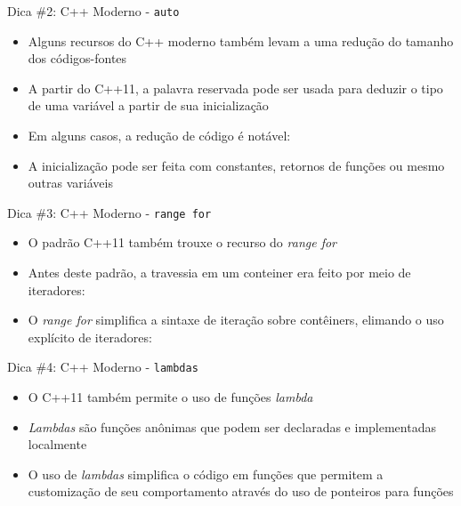 \begin{frame}[fragile]{Dica \#2: C++ Moderno - \texttt{auto}}

    \begin{itemize}
        \item Alguns recursos do C++ moderno também levam a uma redução do tamanho dos 
        códigos-fontes

        \item A partir do C++11, a palavra reservada  pode ser usada para 
            deduzir o tipo de uma variável a partir de sua inicialização

        \item Em alguns casos, a redução de código é notável:

        \item A inicialização pode ser feita com constantes, retornos de funções ou mesmo
            outras variáveis
    \end{itemize}

\end{frame}

\begin{frame}[fragile]{Dica \#3: C++ Moderno - \texttt{range for}}

    \begin{itemize}
        \item O padrão C++11 também trouxe o recurso do \textit{range for}

        \item Antes deste padrão, a travessia em um conteiner era feito por meio de iteradores:

        \item O \textit{range for} simplifica a sintaxe de iteração sobre contêiners,
            elimando o uso explícito de iteradores:
    \end{itemize}

\end{frame}

\begin{frame}[fragile]{Dica \#4: C++ Moderno - \texttt{lambdas}}

    \begin{itemize}
        \item O C++11 também permite o uso de funções \textit{lambda}

        \item \textit{Lambdas} são funções anônimas que podem ser declaradas e 
            implementadas localmente

        \item O uso de \textit{lambdas} simplifica o código em
            funções que permitem a customização de seu comportamento através do uso de
            ponteiros para funções
    \end{itemize}

\end{frame}

